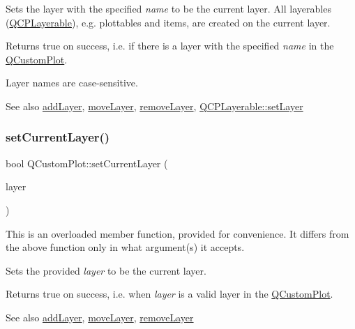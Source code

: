 Sets the layer with the specified {\itshape name} to be the current layer. All layerables (\mbox{\hyperlink{class_q_c_p_layerable}{Q\+C\+P\+Layerable}}), e.\+g. plottables and items, are created on the current layer.

Returns true on success, i.\+e. if there is a layer with the specified {\itshape name} in the \mbox{\hyperlink{class_q_custom_plot}{Q\+Custom\+Plot}}.

Layer names are case-\/sensitive.

\begin{DoxySeeAlso}{See also}
\mbox{\hyperlink{class_q_custom_plot_ad5255393df078448bb6ac83fa5db5f52}{add\+Layer}}, \mbox{\hyperlink{class_q_custom_plot_ae896140beff19424e9e9e02d6e331104}{move\+Layer}}, \mbox{\hyperlink{class_q_custom_plot_a40f75e342c5eaab6a86066a42a0e2a94}{remove\+Layer}}, \mbox{\hyperlink{class_q_c_p_layerable_ab0d0da6d2de45a118886d2c8e16d5a54}{Q\+C\+P\+Layerable\+::set\+Layer}} 
\end{DoxySeeAlso}
\mbox{\label{class_q_custom_plot_a23a4d3cadad1a0063c5fe19aac5659e6}} 
\subsubsection{\texorpdfstring{setCurrentLayer()}{setCurrentLayer()}\hspace{0.1cm}{\footnotesize\ttfamily [2/2]}}
{\footnotesize\ttfamily bool Q\+Custom\+Plot\+::set\+Current\+Layer (\begin{DoxyParamCaption}\item[{\mbox{\hyperlink{class_q_c_p_layer}{Q\+C\+P\+Layer}} $\ast$}]{layer }\end{DoxyParamCaption})}

This is an overloaded member function, provided for convenience. It differs from the above function only in what argument(s) it accepts.

Sets the provided {\itshape layer} to be the current layer.

Returns true on success, i.\+e. when {\itshape layer} is a valid layer in the \mbox{\hyperlink{class_q_custom_plot}{Q\+Custom\+Plot}}.

\begin{DoxySeeAlso}{See also}
\mbox{\hyperlink{class_q_custom_plot_ad5255393df078448bb6ac83fa5db5f52}{add\+Layer}}, \mbox{\hyperlink{class_q_custom_plot_ae896140beff19424e9e9e02d6e331104}{move\+Layer}}, \mbox{\hyperlink{class_q_custom_plot_a40f75e342c5eaab6a86066a42a0e2a94}{remove\+Layer}} 
\end{DoxySeeAlso}
\mbox{\label{class_q_custom_plot_a422bf1bc6d56dac75a3d805d9a65902c}} 
